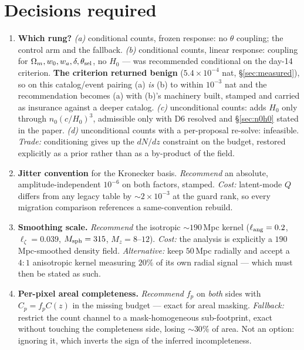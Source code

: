 \documentclass[11pt]{article}
\theoremstyle{definition}
\theoremstyle{remark}
\newcommand{\Msph}{M_{\rm sph}}
\newcommand{\Mz}{M_{z}}
\begin{document}
\section{Decisions required}
\label{sec:decisions}

\begin{enumerate}[leftmargin=2.0em,itemsep=3pt]

\item[\bf D1.] \textbf{Which rung?}
\emph{(a)} conditional counts, frozen response: no $\theta$ coupling; the control arm
and the fallback.
\emph{(b)} conditional counts, linear response: coupling for
$\Omega_m,w_0,w_a,\delta,\theta_{\rm sel}$, no $H_0$ --- was recommended
conditional on the day-14 criterion. \textbf{The criterion returned benign}
($5.4\times10^{-4}$ nat, \S\ref{sec:measured}), so on this catalog/event pairing
(a) \emph{is} (b) to within $10^{-3}$ nat and the recommendation becomes (a) with
(b)'s machinery built, stamped and carried as insurance against a deeper catalog.
\emph{(c)} unconditional counts: adds $H_0$ only through $n_0(c/H_0)^3$, admissible
only with D6 resolved and \S\ref{sec:n0h0} stated in the paper.
\emph{(d)} unconditional counts with a per-proposal re-solve: infeasible.
\emph{Trade:} conditioning gives up the $dN/dz$ constraint on the budget, restored
explicitly as a prior rather than as a by-product of the field.

\item[\bf D2.] \textbf{Jitter convention} for the Kronecker basis. \emph{Recommend}
an absolute, amplitude-independent $10^{-6}$ on both factors, stamped. \emph{Cost:}
latent-mode $Q$ differs from any legacy table by $\sim2\times10^{-3}$ at the guard
rank, so every migration comparison references a same-convention rebuild.

\item[\bf D3.] \textbf{Smoothing scale.} \emph{Recommend} the isotropic
$\sim190$\,Mpc kernel ($\ell_{\rm ang}=0.2$, $\ell_\zeta=0.039$, $\Msph=315$,
$\Mz=8$--$12$). \emph{Cost:} the analysis is explicitly a $190$\,Mpc-smoothed density
field. \emph{Alternative:} keep $50$\,Mpc radially and accept a $4{:}1$ anisotropic
kernel measuring $20\%$ of its own radial signal --- which must then be stated as
such.

\item[\bf D4.] \textbf{Per-pixel areal completeness.} \emph{Recommend} $f_p$ on
\emph{both} sides with $C_p=f_pC(z)$ in the missing budget --- exact for areal
masking. \emph{Fallback:} restrict the count channel to a mask-homogeneous
sub-footprint, exact without touching the completeness side, losing $\sim30\%$ of
area. Not an option: ignoring it, which inverts the sign of the inferred
incompleteness.


\end{enumerate}
\end{document}
